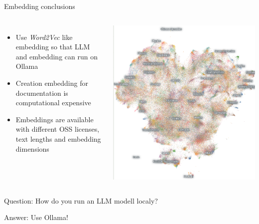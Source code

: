 \documentclass[aspectratio=169]{beamer}
\begin{document}
\begin{frame}{Embedding conclusions}
\begin{columns}
\begin{itemize}
  \item Use \emph{Word2Vec} like embedding so that LLM and embedding can run on Ollama
  \item Creation embedding for documentation is computational expensive
  \item Embeddings are available with different OSS licenses, text lengths and embedding dimensions
\end{itemize}
  \includegraphics[width=\linewidth]{Noimic}
\end{columns}
\end{frame}

\begin{frame}
\begin{block}{Question:}
How do you run an LLM modell localy?
\end{block}
\begin{block}{Answer:}
Use Ollama!
\end{block}
\end{frame}
\end{document}
